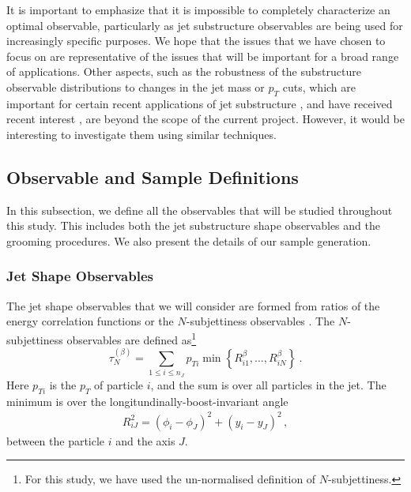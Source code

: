 \documentclass[11pt]{cernrep}
\begin{document}
It is important to emphasize that it is impossible to completely
characterize an optimal observable, particularly as jet substructure
observables are being used for increasingly specific
purposes.
%
We hope that the issues that we have chosen to focus on
are representative of the issues that will be important for a broad
range of applications.
%
Other aspects, such as the robustness of the substructure observable distributions to changes in the jet mass or $p_T$ cuts, which are important for certain recent applications of jet substructure \cite{Sirunyan:2017dgc,CMS-PAS-HIG-17-010,CMS-PAS-EXO-17-001,Sirunyan:2017dnz,Sirunyan:2017nvi,Aaboud:2018zba}, and have received recent interest \cite{Shimmin:2017mfk,Aguilar-Saavedra:2017rzt,Moult:2017okx}, are
beyond the scope of the current project.
However, it would be interesting to investigate them
using similar techniques.




\subsection{Observable and Sample Definitions}\label{jetsub_2prong_sec:obs_def}

In this subsection, we define all the observables that will be studied throughout this study.
%
This includes both the jet substructure shape observables and the grooming procedures.  We also present the details of our sample generation.


\subsubsection{Jet Shape Observables}\label{jetsub_2prong_sec:shape_def}

The jet shape observables that we will consider are formed from ratios of the energy correlation functions \cite{Larkoski:2013eya,Moult:2016cvt} or the $N$-subjettiness observables \cite{Thaler:2010tr,Thaler:2011gf}.
%
The $N$-subjettiness observables are defined as\footnote{For this
  study, we have used the un-normalised definition of $N$-subjettiness.}~\cite{Stewart:2010tn,Thaler:2010tr,Thaler:2011gf}
%
\begin{equation}\label{jetsub_2prong_eq:nsubdef}
  \tau_{N}^{(\beta)} =
  \sum_{1\leq i \leq n_J} p_{Ti}\min\left\{
R_{i1}^\beta,\dotsc,R_{iN}^\beta
\right\} \ .
\end{equation}
%
Here $p_{Ti}$ is the $p_T$ of particle $i$, and the sum is over all
particles in the jet.
%
The minimum is over the longitundinally-boost-invariant angle
%
\begin{align}
R_{iJ}^2 = (\phi_i-\phi_J)^2+(y_i-y_J)^2\,,
\end{align}
%
between the particle $i$ and the axis $J$.
\end{document}
